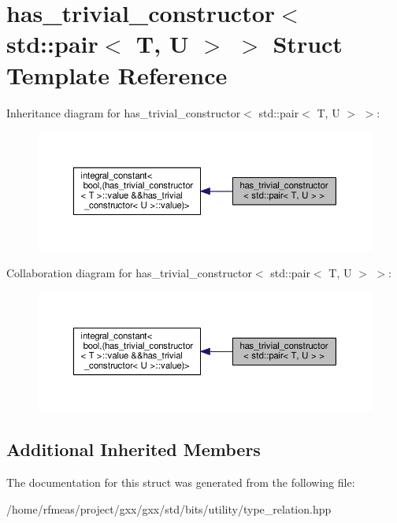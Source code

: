 \hypertarget{structhas__trivial__constructor_3_01std_1_1pair_3_01T_00_01U_01_4_01_4}{}\section{has\+\_\+trivial\+\_\+constructor$<$ std\+:\+:pair$<$ T, U $>$ $>$ Struct Template Reference}
\label{structhas__trivial__constructor_3_01std_1_1pair_3_01T_00_01U_01_4_01_4}


Inheritance diagram for has\+\_\+trivial\+\_\+constructor$<$ std\+:\+:pair$<$ T, U $>$ $>$\+:
\nopagebreak
\begin{figure}[H]
\begin{center}
\leavevmode
\includegraphics[width=350pt]{structhas__trivial__constructor_3_01std_1_1pair_3_01T_00_01U_01_4_01_4__inherit__graph}
\end{center}
\end{figure}


Collaboration diagram for has\+\_\+trivial\+\_\+constructor$<$ std\+:\+:pair$<$ T, U $>$ $>$\+:
\nopagebreak
\begin{figure}[H]
\begin{center}
\leavevmode
\includegraphics[width=350pt]{structhas__trivial__constructor_3_01std_1_1pair_3_01T_00_01U_01_4_01_4__coll__graph}
\end{center}
\end{figure}
\subsection*{Additional Inherited Members}


The documentation for this struct was generated from the following file\+:\begin{DoxyCompactItemize}
\item 
/home/rfmeas/project/gxx/gxx/std/bits/utility/type\+\_\+relation.\+hpp\end{DoxyCompactItemize}
